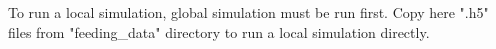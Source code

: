 To run a local simulation, global simulation must be run first.
Copy here ".h5" files from "feeding_data" directory to run a local simulation directly.
